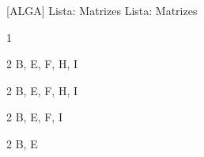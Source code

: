 \documentclass[\mainfilename]{subfiles}
\begin{document}
[ALGA]
{Lista: Matrizes}
{Lista: Matrizes}

\begin{questionBox}1{}
    \begin{multicols}{2}
        \begin{questionBox}2{}
            B, E, F, H, I
        \end{questionBox}
        \begin{questionBox}2{}
            B, E, F, H, I
        \end{questionBox}
        \begin{questionBox}2{}
            B, E, F, I
        \end{questionBox}
        \begin{questionBox}2{}
            B, E
        \end{questionBox}
    \end{multicols}
\end{questionBox}
\end{document}
